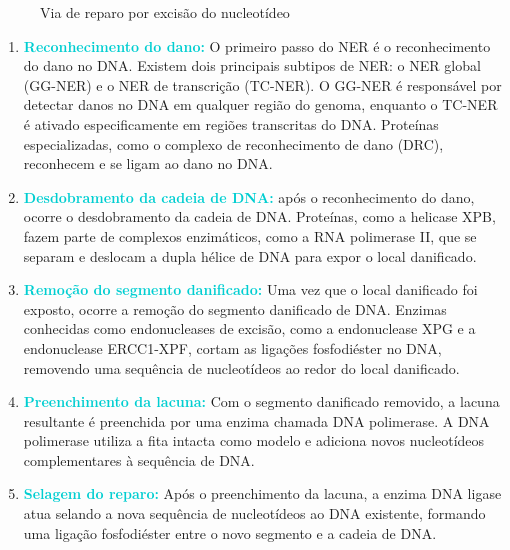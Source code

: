 \documentclass[11pt,a4paper]{article}
\begin{document}
	\begin{figure}[h]
		\centering
		\caption{Via de reparo por excisão do nucleotídeo}
		\label{fig:reparoExcisaoNucleotidio}
	\end{figure}

	\begin{enumerate}[label=\textcolor{CarnationPink}{\arabic*${}^\circ $}]
		\item \textcolor{DarkTurquoise}{\textbf{Reconhecimento do dano:}} O primeiro passo do NER é o reconhecimento do dano no DNA. Existem dois principais subtipos de NER: o NER global (GG-NER) e o NER de transcrição (TC-NER). O GG-NER é responsável por detectar danos no DNA em qualquer região do genoma, enquanto o TC-NER é ativado especificamente em regiões transcritas do DNA. Proteínas especializadas, como o complexo de reconhecimento de dano (DRC), reconhecem e se ligam ao dano no DNA.
		\item \textcolor{DarkTurquoise}{\textbf{Desdobramento da cadeia de DNA:}} após o reconhecimento do dano, ocorre o desdobramento da cadeia de DNA. Proteínas, como a helicase XPB, fazem parte de complexos enzimáticos, como a RNA polimerase II, que se separam e deslocam a dupla hélice de DNA para expor o local danificado.
		\item \textcolor{DarkTurquoise}{\textbf{Remoção do segmento danificado:}} Uma vez que o local danificado foi exposto, ocorre a remoção do segmento danificado de DNA. Enzimas conhecidas como endonucleases de excisão, como a endonuclease XPG e a endonuclease ERCC1-XPF, cortam as ligações fosfodiéster no DNA, removendo uma sequência de nucleotídeos ao redor do local danificado.
		\item \textcolor{DarkTurquoise}{\textbf{Preenchimento da lacuna:}} Com o segmento danificado removido, a lacuna resultante é preenchida por uma enzima chamada DNA polimerase. A DNA polimerase utiliza a fita intacta como modelo e adiciona novos nucleotídeos complementares à sequência de DNA.
		\item \textcolor{DarkTurquoise}{\textbf{Selagem do reparo:}} Após o preenchimento da lacuna, a enzima DNA ligase atua selando a nova sequência de nucleotídeos ao DNA existente, formando uma ligação fosfodiéster entre o novo segmento e a cadeia de DNA.
	\end{enumerate}
\end{document}
